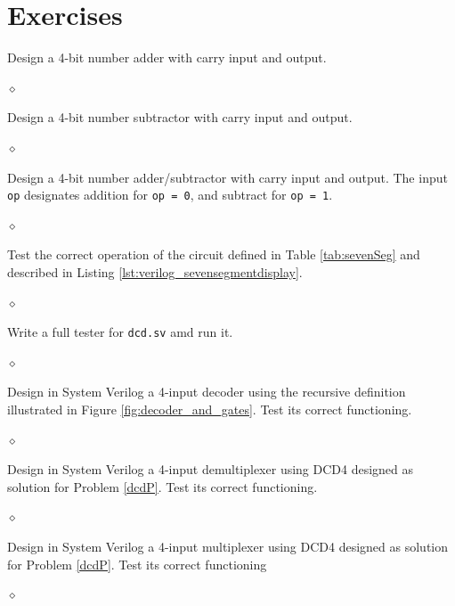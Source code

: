 
\section{Exercises}

\begin{problem}
Design a 4-bit number adder with carry input and output.

$\diamond$
\end{problem}

\begin{problem}
Design a 4-bit number subtractor  with carry input and output.

$\diamond$
\end{problem}

\begin{problem}
Design a 4-bit number adder/subtractor with carry input and output. The input {\tt op} designates addition for {\tt op = 0}, and subtract for {\tt op = 1}.

$\diamond$
\end{problem}

\begin{problem}
Test the correct operation of the circuit defined in Table \ref{tab:sevenSeg} and described in Listing \ref{lst:verilog_sevensegmentdisplay}.

$\diamond$
\end{problem}

\begin{problem}
Write a full tester for {\tt dcd.sv} amd run it.

$\diamond$
\end{problem}

\begin{problem}\label{dcdP}
Design in System Verilog a 4-input decoder using the recursive definition illustrated  in Figure \ref{fig:decoder_and_gates}. Test its correct functioning.

$\diamond$
\end{problem}

\begin{problem}
Design in System Verilog a 4-input demultiplexer using DCD4 designed as solution for Problem \ref{dcdP}. Test its correct functioning.

$\diamond$
\end{problem}

\begin{problem}
Design in System Verilog a 4-input multiplexer using DCD4 designed as solution for Problem \ref{dcdP}. Test its correct functioning

$\diamond$
\end{problem}

